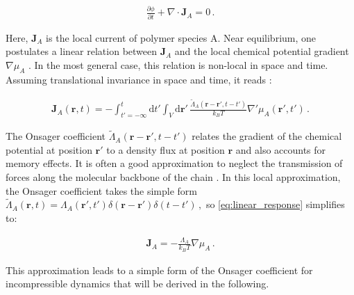 \documentclass[bachelor,       %
               oneside,        %
               BCOR10mm,       %
               ngerman, english %
               ]{GAUBM}
\begin{document}
\begin{align}
  \frac{\partial\phi}{\partial t}+\nabla\cdot\mathbf{J}_A=0\,.
  \label{eq:conti}
\end{align}

Here, $\mathbf{J}_A$ is the local current of polymer species A. Near equilibrium, one postulates a linear relation between $\mathbf{J}_A$ and the local chemical potential gradient $\nabla\mu_A$ \cite{deGennes80}. In the most general case, this relation is non-local in space and time. Assuming translational invariance in space and time, it reads \cite{erukhimovich1986nonexponential}:


\begin{align}
    \mathbf{J}_A(\mathbf{r},t)=-\int_{t'=-\infty}^t\mathrm d t'\int_V\mathrm d \mathbf{r'}\,\frac{\tilde\Lambda_A(\mathbf{r}- \mathbf{r'},t-t')}{k_BT}\nabla '\mu_A(\mathbf{r'},t')\,.
    \label{eq:linear_response}
\end{align}

The Onsager coefficient $\tilde\Lambda_A(\mathbf{r}- \mathbf{r'},t-t')$ relates the gradient of the chemical potential at position $\mathbf{r'}$ to a density flux at position $\mathbf r$ and also accounts for memory effects. It is often a good approximation to neglect the transmission of forces along the molecular backbone of the chain \cite{COOK1970297}. In this local approximation, the Onsager coefficient takes the simple form $\tilde\Lambda_A(\mathbf r,t)=\Lambda_A(\mathbf{r'},t')\delta(\mathbf r-\mathbf r')\delta(t-t')\,,$ so \autoref{eq:linear_response} simplifies to: 



\begin{align}
    \mathbf {J}_A=-\frac{\Lambda_A}{k_BT}\nabla\mu_A\,.
    \label{eq:current_local}
\end{align}


This approximation leads to a simple form of the Onsager coefficient for incompressible dynamics that will be derived in the following. 



\end{document}

